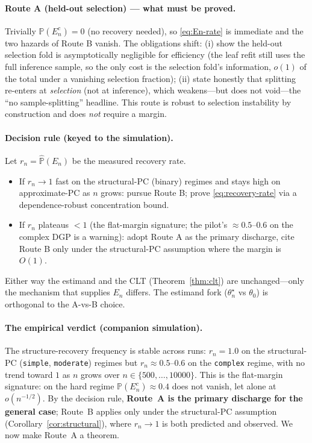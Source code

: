 \documentclass[11pt]{article}
\theoremstyle{plain}
\theoremstyle{definition}
\theoremstyle{remark}
\newcommand{\PP}{\mathbb{P}}
\newcommand{\thstar}{\theta^{\star}_n}
\newcommand{\odiff}{o}
\begin{document}
\paragraph{Route A (held-out selection) --- what must be proved.}
Trivially $\PP(E_n^c)=0$ (no recovery needed), so \eqref{eq:En-rate} is immediate
and the two hazards of Route B vanish. The obligations shift: (i) show the
held-out selection fold is asymptotically negligible for efficiency (the leaf
refit still uses the full inference sample, so the only cost is the selection
fold's information, $\odiff(1)$ of the total under a vanishing selection
fraction); (ii) state honestly that splitting re-enters at \emph{selection} (not
at inference), which weakens---but does not void---the ``no sample-splitting''
headline. This route is robust to selection instability by construction and does
\emph{not} require a margin.

\paragraph{Decision rule (keyed to the simulation).}
Let $r_n=\widehat{\PP}(E_n)$ be the measured recovery rate.
\begin{itemize}
  \item If $r_n\to1$ fast on the structural-PC (binary) regimes and stays high on
  approximate-PC as $n$ grows: pursue Route B; prove \eqref{eq:recovery-rate} via
  a dependence-robust concentration bound.
  \item If $r_n$ plateaus $<1$ (the flat-margin signature; the pilot's
  $\approx0.5$--$0.6$ on the complex DGP is a warning): adopt Route A as the
  primary discharge, cite Route B only under the structural-PC assumption where
  the margin is $O(1)$.
\end{itemize}
Either way the estimand and the CLT (Theorem~\ref{thm:clt}) are unchanged---only
the mechanism that supplies $E_n$ differs. The estimand fork ($\thstar$ vs
$\theta_0$) is orthogonal to the A-vs-B choice.

\paragraph{The empirical verdict (companion simulation).}
The structure-recovery frequency is stable across runs: $r_n=1.0$ on the
structural-PC (\texttt{simple}, \texttt{moderate}) regimes but $r_n\approx0.5$--$0.6$
on the \texttt{complex} regime, with no trend toward $1$ as $n$ grows over
$n\in\{500,\dots,10000\}$. This is the flat-margin signature: on the hard regime
$\PP(E_n^c)\approx0.4$ does not vanish, let alone at $\odiff(n^{-1/2})$. By the
decision rule, \textbf{Route~A is the primary discharge for the general case};
Route~B applies only under the structural-PC assumption
(Corollary~\ref{cor:structural}), where $r_n\to1$ is both predicted and observed.
We now make Route~A a theorem.
\end{document}
